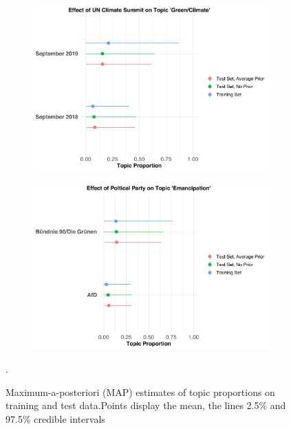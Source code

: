 \begin{figure}[h!]
  \centering
  \captionsetup{justification=centering}
  \begin{subfigure}[b]{0.49\linewidth}
    \includegraphics[width=\linewidth]{../plots/4_7/climate_summit_props.pdf}
  \end{subfigure}
  \begin{subfigure}[b]{0.49\linewidth}
    \includegraphics[width=\linewidth]{../plots/4_7/emancipation_props.pdf}
  \end{subfigure}
  \caption{Maximum-a-posteriori (MAP) estimates of topic proportions on training and test data.Points display the mean, the lines  2.5\% and 97.5\% credible intervals}.
  \label{fig:causal_inference_props}
\end{figure}

